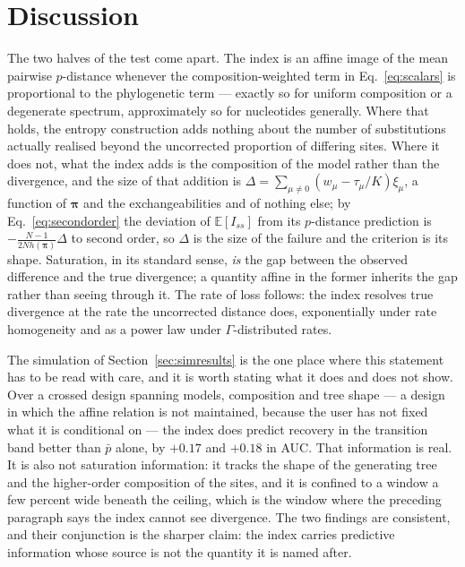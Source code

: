\documentclass[11pt]{article}
\newcommand{\Iss}{I_{ss}}
\newcommand{\bpi}{\boldsymbol{\pi}}
\newcommand{\E}{\mathbb{E}}
\theoremstyle{definition}
\theoremstyle{remark}
\begin{document}
\section{Discussion}

The two halves of the test come apart. The index is an affine image of the mean
pairwise $p$-distance whenever the composition-weighted term in
Eq.~\eqref{eq:scalars} is proportional to the phylogenetic term --- exactly so
for uniform composition or a degenerate spectrum, approximately so for
nucleotides generally. Where that holds, the entropy construction adds nothing
about the number of substitutions actually realised beyond the uncorrected
proportion of differing sites. Where it does not, what the index adds is the
composition of the model rather than the divergence, and the size of that
addition is $\Delta=\sum_{\mu\ne0}(w_\mu-\tau_\mu/K)\xi_\mu$, a function of
$\bpi$ and the exchangeabilities and of nothing else; by
Eq.~\eqref{eq:secondorder} the deviation of $\E[\Iss]$ from its $p$-distance
prediction is $-\frac{N-1}{2Nh(\bpi)}\Delta$ to second order, so $\Delta$ is
the size of the failure and the criterion is its shape. Saturation, in its
standard sense, \emph{is} the gap between the
observed difference and the true divergence; a quantity affine in the former
inherits the gap rather than seeing through it. The rate of loss
follows: the index resolves true divergence at the rate the uncorrected
distance does, exponentially under rate homogeneity and as a power law under
$\Gamma$-distributed rates.

The simulation of Section~\ref{sec:simresults} is the one place where this
statement has to be read with care, and it is worth stating what it does and
does not show. Over a crossed design spanning models, composition and tree
shape --- a design in which the affine relation is not maintained, because the
user has not fixed what it is conditional on --- the index does predict
recovery in the transition band better than $\bar p$ alone, by $+0.17$ and
$+0.18$ in AUC. That information is real. It is also not saturation
information: it tracks the shape of the generating tree and the higher-order
composition of the sites, and it is confined to a window a few percent wide
beneath the ceiling, which is the window where the preceding paragraph says the
index cannot see divergence. The two findings are consistent, and their
conjunction is the sharper claim: the index carries predictive information
whose source is not the quantity it is named after.
\end{document}
